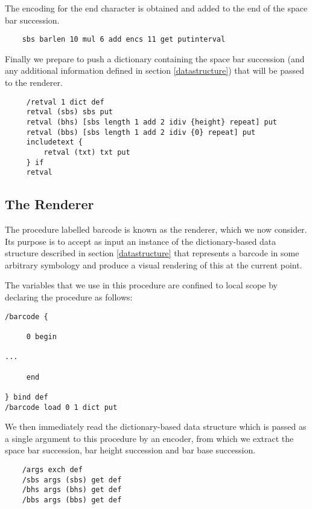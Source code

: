 \documentclass[11pt,english,BCOR10mm,DIV12,bibliography=totoc,parskip=false,smallheadings
    headexclude,footexclude,oneside]{pst-doc}
\begin{document}
The encoding for the end character is obtained and added to 
the end of the space bar succession.

\begin{lstlisting}
    sbs barlen 10 mul 6 add encs 11 get putinterval
\end{lstlisting}

Finally we prepare to push a dictionary containing the space bar 
succession (and any additional information defined in section
\ref{datastructure}) that will be passed to the renderer.

\begin{lstlisting}
     /retval 1 dict def
     retval (sbs) sbs put
     retval (bhs) [sbs length 1 add 2 idiv {height} repeat] put
     retval (bbs) [sbs length 1 add 2 idiv {0} repeat] put
     includetext {
         retval (txt) txt put
     } if
     retval
\end{lstlisting}


\subsection{The Renderer}

The procedure labelled barcode is known as the renderer, which we now
consider. Its purpose is to accept as input an instance of the
dictionary-based data structure described in section
\ref{datastructure} that represents a barcode in some arbitrary
symbology and produce a visual rendering of this at the current
point.

The variables that we use in this procedure are confined to local
scope by declaring the procedure as follows:

\begin{lstlisting}
/barcode {
 
     0 begin

...

     end

} bind def
/barcode load 0 1 dict put
\end{lstlisting}

We then immediately read the dictionary-based data structure which 
is passed as a single argument to this procedure by an encoder, from
which we extract the space bar succession, bar height succession and bar
base succession.

\begin{lstlisting}
    /args exch def
    /sbs args (sbs) get def
    /bhs args (bhs) get def
    /bbs args (bbs) get def
\end{lstlisting}
\end{document}
